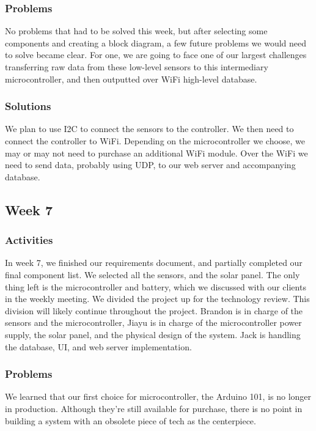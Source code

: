 \documentclass[IEEEtran,letterpaper,10pt,titlepage,fleqn,draftclsnofoot,onecolumn]{article}
\begin{document}
\subsubsection{Problems}

No problems that had to be solved this week, but after selecting some components and creating a block diagram, a few future problems we would need to solve became clear. For one, we are going to face one of our largest challenges transferring raw data from these low-level sensors to this intermediary microcontroller, and then outputted over WiFi high-level database.

\subsubsection{Solutions}

We plan to use I2C to connect the sensors to the controller. We then need to connect the controller to WiFi. Depending on the microcontroller we choose, we may or may not need to purchase an additional WiFi module. Over the WiFi we need to send data, probably using UDP, to our web server and accompanying database. 

\subsection{Week 7}
\subsubsection{Activities}

In week 7, we finished our requirements document, and partially completed our final component list. We selected all the sensors, and the solar panel. The only thing left is the microcontroller and battery, which we discussed with our clients in the weekly meeting. We divided the project up for the technology review. This division will likely continue throughout the project. Brandon is in charge of the sensors and the microcontroller, Jiayu is in charge of the microcontroller power supply, the solar panel, and the physical design of the system. Jack is handling the database, UI, and web server implementation. 

\subsubsection{Problems}

We learned that our first choice for microcontroller, the Arduino 101, is no longer in production. Although they’re still available for purchase, there is no point in building a system with an obsolete piece of tech as the centerpiece. 
\end{document}
